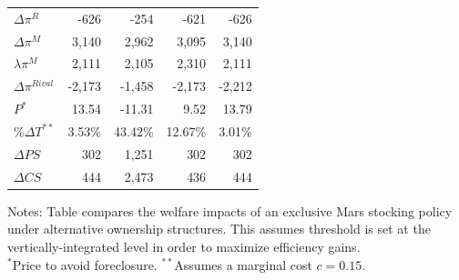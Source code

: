 \documentclass[aspectratio=169,11pt]{beamer}
\begin{document}
\begin{frame}
\begin{table}[htbp]
\begin{center}
\begin{tabular}{|l | rrrr|}
 $\Delta \pi^R$ & -626 & -254 & -621 & -626 \\
$\Delta \pi^M$ & 3,140 & 2,962 & 3,095 & 3,140 \\
$\lambda \pi^M$ & 2,111 & 2,105 & 2,310 & 2,111 \\
$\Delta \pi^{Rival}$ & -2,173 & -1,458 & -2,173 & -2,212 \\ 
\hline
$P^*$ & 13.54 & -11.31 & 9.52 & 13.79 \\
\%$\Delta T^{**}$ & 3.53\% & 43.42\% & 12.67\% & 3.01\% \\
\hline
    $\Delta PS$  & 302   & 1,251 & 302   & 302 \\
    $\Delta CS$ & 444   & 2,473 & 436   & 444 \\
\hline
    \end{tabular}
\end{center}
\tiny
Notes: Table compares the welfare impacts of an exclusive Mars stocking policy under alternative ownership structures. This assumes threshold is set at the vertically-integrated level in order to maximize efficiency gains.\\
$^*$Price to avoid foreclosure.
$^{**}$Assumes a marginal cost $c=0.15.$\\
\end{table}
\end{frame}
\end{document}
